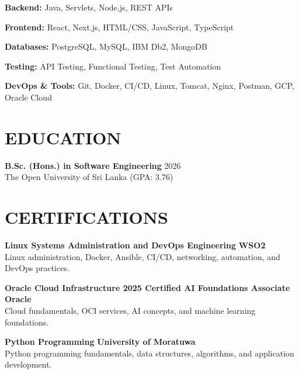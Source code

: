 \documentclass[12pt,a4paper]{article}
\begin{document}
\vspace{3pt}

\noindent\textbf{Backend:} Java, Servlets, Node.js, REST APIs
\vspace{3pt}

\noindent\textbf{Frontend:} React, Next.js, HTML/CSS, JavaScript, TypeScript

\vspace{3pt}

\noindent\textbf{Databases:} PostgreSQL, MySQL, IBM Db2, MongoDB

\vspace{3pt}

\noindent\textbf{Testing:} API Testing, Functional Testing, Test Automation

\vspace{3pt}

\noindent\textbf{DevOps \& Tools:} Git, Docker, CI/CD, Linux, Tomcat, Nginx, Postman, GCP, Oracle Cloud

\vspace{8pt}

\section*{EDUCATION}

\noindent\textbf{B.Sc. (Hons.) in Software Engineering} \hfill 2026\\
The Open University of Sri Lanka (GPA: 3.76)

\vspace{5pt}
\section*{CERTIFICATIONS}

\noindent\textbf{Linux Systems Administration and DevOps Engineering} 
\hfill {\color{companycolor}\textbf{WSO2}}\\
Linux administration, Docker, Ansible, CI/CD, networking, automation, and DevOps practices.

\vspace{6pt}

\noindent\textbf{Oracle Cloud Infrastructure 2025 Certified AI Foundations Associate} 
\hfill {\color{companycolor}\textbf{Oracle}}\\
Cloud fundamentals, OCI services, AI concepts, and machine learning foundations.

\vspace{6pt}

\noindent\textbf{Python Programming} 
\hfill {\color{companycolor}\textbf{University of Moratuwa}}\\
Python programming fundamentals, data structures, algorithms, and application development.
\end{document}
